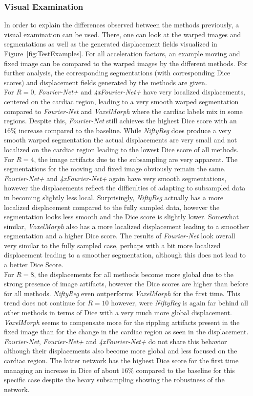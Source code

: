 \subsubsection{Visual Examination}
In order to explain the differences observed between the methods previously, a visual examination can be used. There, one can look at the warped images and segmentations as well as the generated displacement fields visualized in Figure~\ref{fig:TestExamples}. For all acceleration factors, an example moving and fixed image can be compared to the warped images by the different methods. For further analysis, the corresponding segmentations (with corresponding Dice scores) and displacement fields generated by the methods are given.\\
For $R=0$, \emph{Fourier-Net+} and \emph{4xFourier-Net+} have very localized displacements, centered on the cardiac region, leading to a very smooth warped segmentation compared to \emph{Fourier-Net} and \emph{VoxelMorph} where the cardiac labels mix in some regions. Despite this, \emph{Fourier-Net} still achieves the highest Dice score with an $16\%$ increase compared to the baseline. While \emph{NiftyReg} does produce a very smooth warped segmentation the actual displacements are very small and not localized on the cardiac region leading to the lowest Dice score of all methods.\\
For $R=4$, the image artifacts due to the subsampling are very apparent. The segmentations for the moving and fixed image obviously remain the same.
\emph{Fourier-Net+} and \emph{4xFourier-Net+} again have very smooth segmentations, however the displacements reflect the difficulties of adapting to subsampled data in becoming slightly less local. Surprisingly, \emph{NiftyReg} actually has a more localized displacement compared to the fully sampled data, however the segmentation looks less smooth and the Dice score is slightly lower. Somewhat similar, \emph{VoxelMorph} also has a more localized displacement leading to a smoother segmentation and a higher Dice score. The results of \emph{Fourier-Net} look overall very similar to the fully sampled case, perhaps with a bit more localized displacement leading to a smoother segmentation, although this does not lead to a better Dice Score.\\
For $R=8$, the displacements for all methods become more global due to the strong presence of image artifacts, however the Dice scores are higher than before for all methods. \emph{NiftyReg} even outperforms \emph{VoxelMorph} for the first time. This trend does not continue for $R=10$ however, were \emph{NiftyReg} is again far behind all other methods in terms of Dice with a very much more global displacement. \emph{VoxelMorph} seems to compensate more for the rippling artifacts present in the fixed image than for the change in the cardiac region as seen in the displacement. \emph{Fourier-Net}, \emph{Fourier-Net+} and \emph{4xFourier-Net+} do not share this behavior although their displacements also become more global and less focused on the cardiac region. The latter network has the highest Dice score for the first time managing an increase in Dice of about $16\%$ compared to the baseline for this specific case despite the heavy subsampling showing the robustness of the network.

